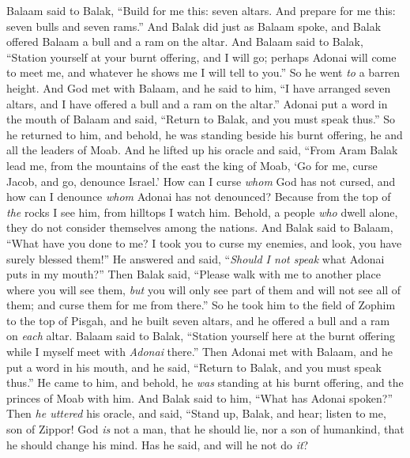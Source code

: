 \begin{biblechapter} %
 Balaam said to Balak, “Build for me this: seven altars. And prepare for me this: seven bulls and seven rams.”
\verse And Balak did just as Balaam spoke, and Balak offered Balaam a bull and a ram on the altar.
\verse And Balaam said to Balak, “Station yourself at your burnt offering, and I will go; perhaps Adonai will come to meet me, and whatever he shows me I will tell to you.” So he went \textit{to} a barren height.
\verse And God met with Balaam, and he said to him, “I have arranged seven altars, and I have offered a bull and a ram on the altar.”
\verse Adonai put a word in the mouth of Balaam and said, “Return to Balak, and you must speak thus.”
\verse So he returned to him, and behold, he was standing beside his burnt offering, he and all the leaders of Moab.
\verse And he lifted up his oracle and said,
\verse “From Aram Balak lead me, 
from the mountains of the east the king of Moab, 
‘Go for me, curse Jacob, 
and go, denounce Israel.’
\verse How can I curse \textit{whom} God has not cursed, 
and how can I denounce \textit{whom} Adonai has not denounced?
\verse Because from the top of \textit{the} rocks I see him, 
from hilltops I watch him. 
Behold, a people \textit{who} dwell alone, 
they do not consider themselves among the nations.
\verse And Balak said to Balaam, “What have you done to me? I took you to curse my enemies, and look, you have surely blessed them!”
\verse He answered and said, “\textit{Should I not speak} what Adonai puts in my mouth?”
\verse Then Balak said, “Please walk with me to another place where you will see them, \textit{but} you will only see part of them and will not see all of them; and curse them for me from there.”
\verse So he took him to the field of Zophim to the top of Pisgah, and he built seven altars, and he offered a bull and a ram on \textit{each} altar.
\verse Balaam said to Balak, “Station yourself here at the burnt offering while I myself meet with \textit{Adonai} there.”
\verse Then Adonai met with Balaam, and he put a word in his mouth, and he said, “Return to Balak, and you must speak thus.”
\verse He came to him, and behold, he \textit{was} standing at his burnt offering, and the princes of Moab with him. And Balak said to him, “What has Adonai spoken?”
\verse Then \textit{he uttered} his oracle, and said,
\verse “Stand up, Balak, and hear; 
listen to me, son of Zippor!
\verse God \textit{is} not a man, that he should lie, 
nor a son of humankind, 
that he should change his mind. 
Has he said, and will he not do \textit{it}? 

\end{biblechapter}
